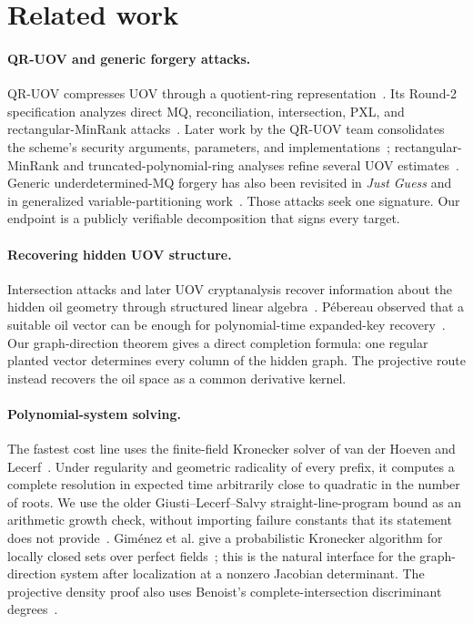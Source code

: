 \documentclass[11pt,a4paper]{article}
\theoremstyle{definition}
\theoremstyle{remark}
\newcommand{\QRUOV}{\textsf{QR-UOV}}
\begin{document}
\section{Related work}\label{sec:related}

\paragraph{QR-UOV and generic forgery attacks.}
\QRUOV{} compresses UOV through a quotient-ring representation~\cite{QRUOV2021}.  Its Round-2 specification analyzes direct MQ, reconciliation, intersection, PXL, and rectangular-MinRank attacks~\cite{QRUOVSpec}.  Later work by the \QRUOV{} team consolidates the scheme's security arguments, parameters, and implementations~\cite{FurueEtAl2026}; rectangular-MinRank and truncated-polynomial-ring analyses refine several UOV estimates~\cite{FurueIkematsu,Suzuki,FurueIkematsu2026}.  Generic underdetermined-MQ forgery has also been revisited in \emph{Just Guess} and in generalized variable-partitioning work~\cite{JustGuess,QRUOVJustGuess,Asanuma2026}.  Those attacks seek one signature.  Our endpoint is a publicly verifiable decomposition that signs every target.

\paragraph{Recovering hidden UOV structure.}
Intersection attacks and later UOV cryptanalysis recover information about the hidden oil geometry through structured linear algebra~\cite{Beullens}.  P\'ebereau observed that a suitable oil vector can be enough for polynomial-time expanded-key recovery~\cite{Pebereau}.  Our graph-direction theorem gives a direct completion formula: one regular planted vector determines every column of the hidden graph.  The projective route instead recovers the oil space as a common derivative kernel.

\paragraph{Polynomial-system solving.}
The fastest cost line uses the finite-field Kronecker solver of van der Hoeven and Lecerf~\cite{vdHL}.  Under regularity and geometric radicality of every prefix, it computes a complete resolution in expected time arbitrarily close to quadratic in the number of roots.  We use the older Giusti--Lecerf--Salvy straight-line-program bound as an arithmetic growth check, without importing failure constants that its statement does not provide~\cite{GiustiLecerfSalvy2001}.  Gim\'enez et al. give a probabilistic Kronecker algorithm for locally closed sets over perfect fields~\cite{Gimenez2026}; this is the natural interface for the graph-direction system after localization at a nonzero Jacobian determinant.  The projective density proof also uses Benoist's complete-intersection discriminant degrees~\cite{Benoist}.
\end{document}
